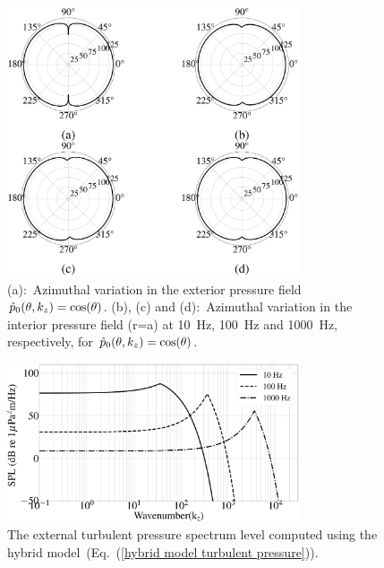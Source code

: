 \documentclass[11pt,cleanfoot]{asme2ej}
\begin{document}
\begin{figure}[ht]
    \centering
    \includegraphics[width=3.4in]{polarplot_cos_theta.eps}
    \caption{(a):~Azimuthal variation in the exterior pressure field $\Hat{p}_0(\theta,k_z) =\cos(\theta)$. (b), (c) and (d):~Azimuthal variation in the interior pressure field (r=a) at 10~Hz, 100~Hz and 1000~Hz, respectively, for $\Hat{p}_0(\theta,k_z) =\cos(\theta)$.}
    \label{polar plot cos theta}
\end{figure}



\begin{figure}[ht]
    \centering
    \includegraphics[width=3.4in]{Comparison_of_turbulent_pressure_spectrum_of_Hybrid.eps}
    \caption{The external turbulent pressure spectrum level computed using the hybrid model~(Eq.~(\ref{hybrid model turbulent pressure})).}
    \label{Hybrid turbulent pressure spectrum}
\end{figure}
\end{document}
